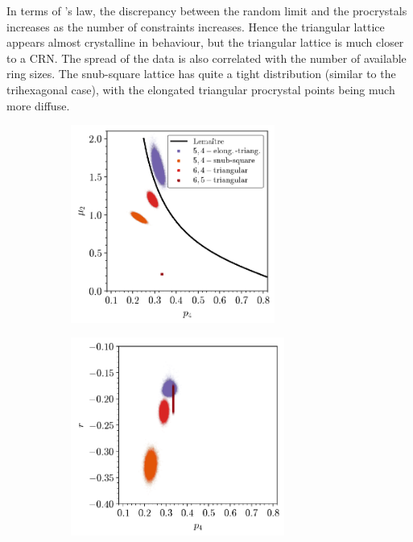 In terms of \lm's law, the discrepancy between the random limit and the procrystals increases as the number of constraints increases. 
Hence the triangular lattice appears almost crystalline in behaviour, but the triangular lattice is much closer to a CRN.
The spread of the data is also correlated with the number of available ring sizes.
The snub\--square lattice has quite a tight distribution (similar to the trihexagonal case), with the elongated triangular procrystal points being much more diffuse.

\begin{figure}[bt]
     \centering
     
     \begin{subfigure}[b]{0.45\textwidth}
         \centering
         \includegraphics[height=6.5cm]{./figures/procrystals/pro45_p4_mu2.pdf}
         \caption{}
         \label{fig:pro45p6mu2}
     \end{subfigure}
     \hspace{1cm}
     \begin{subfigure}[b]{0.45\textwidth}
         \centering
         \includegraphics[height=6.5cm]{./figures/procrystals/pro45_p4_r.pdf}
         \caption{}
         \label{fig:pro45p6r}
     \end{subfigure}
     

\end{figure}
